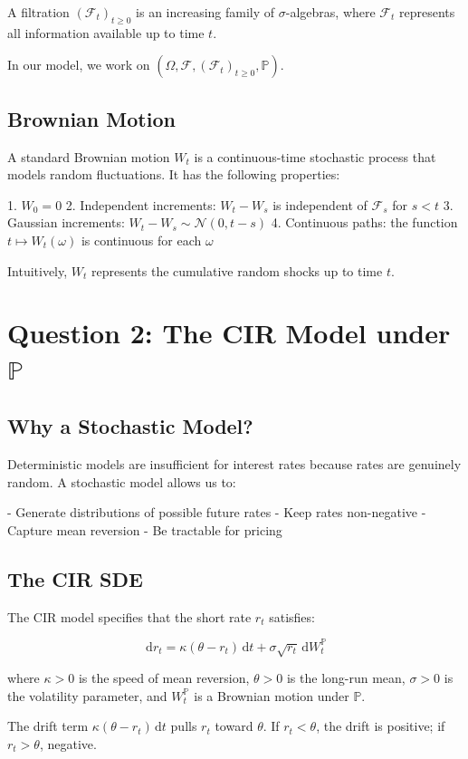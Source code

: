 \documentclass[11pt]{article}
\newcommand{\PP}{\mathbb{P}}
\newcommand{\FF}{\mathcal{F}}
\newcommand{\NN}{\mathcal{N}}
\newcommand{\dd}{\,\mathrm{d}}
\begin{document}
A filtration $(\FF_t)_{t \ge 0}$ is an increasing family of $\sigma$-algebras, where $\FF_t$ represents all information available up to time $t$.

In our model, we work on $(\Omega, \FF, (\FF_t)_{t \ge 0}, \PP)$.

\subsection{Brownian Motion}

A standard Brownian motion $W_t$ is a continuous-time stochastic process that models random fluctuations. It has the following properties:

1. $W_0 = 0$
2. Independent increments: $W_t - W_s$ is independent of $\FF_s$ for $s < t$
3. Gaussian increments: $W_t - W_s \sim \NN(0, t-s)$
4. Continuous paths: the function $t \mapsto W_t(\omega)$ is continuous for each $\omega$

Intuitively, $W_t$ represents the cumulative random shocks up to time $t$.

\section{Question 2: The CIR Model under $\PP$}

\subsection{Why a Stochastic Model?}

Deterministic models are insufficient for interest rates because rates are genuinely random. A stochastic model allows us to:

- Generate distributions of possible future rates
- Keep rates non-negative
- Capture mean reversion
- Be tractable for pricing

\subsection{The CIR SDE}

The CIR model specifies that the short rate $r_t$ satisfies:

\[
\dd r_t = \kappa (\theta - r_t) \dd t + \sigma \sqrt{r_t} \dd W_t^\PP
\]

where $\kappa > 0$ is the speed of mean reversion, $\theta > 0$ is the long-run mean, $\sigma > 0$ is the volatility parameter, and $W_t^\PP$ is a Brownian motion under $\PP$.

The drift term $\kappa (\theta - r_t) \dd t$ pulls $r_t$ toward $\theta$. If $r_t < \theta$, the drift is positive; if $r_t > \theta$, negative.
\end{document}
